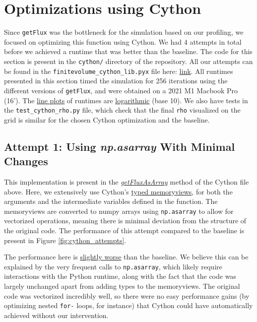 \documentclass[a4paper,10pt]{article}
\begin{document}
\section{Optimizations using Cython}
Since \verb|getFlux| was the bottleneck for the simulation based on our profiling, we focused on optimizing this function using Cython. We had 4 attempts in total before we achieved a runtime that was better than the baseline. The code for this section is present in the \verb|cython/| directory of the repository. All our attempts can be found in the \verb|finitevolume_cython_lib.pyx| file here: \href{https://github.com/paulmyr/DD2358-HPC25/blob/master/10_project_rishi_paul/code/cython/finitevolume_cython_lib.pyx}{link}.  All runtimes presented in this section timed the simulation for 256 iterations using the different versions of \verb|getFlux|, and were obtained on a 2021 M1 Macbook Pro (16'). The \underline{line plots} of runtimes are \underline{logarithmic} (base 10). We also have tests in the \verb|test_cython_rho.py| file, which check that the final \verb|rho| visualized on the grid is similar for the chosen Cython optimization and the baseline.

\subsection{Attempt 1: Using \textit{np.asarray} With Minimal Changes}
This implementation is present in the \href{https://github.com/paulmyr/DD2358-HPC25/blob/master/10_project_rishi_paul/code/cython/finitevolume_cython_lib.pyx#L8}{\textit{getFluxAsArray}} method of the Cython file above. Here, we extensively use Cython's \underline{typed memoryviews}, for both the arguments and the intermediate variables defined in the function. The memoryviews are converted to numpy arrays using \verb|np.asarray| to allow for vectorized operations, meaning there is minimal deviation from the structure of the original code. The performance of this attempt compared to the baseline is present in Figure \ref{fig:cython_attempts}. 

The performance here is \underline{slightly worse} than the baseline. We believe this can be explained by the very frequent calls to \verb|np.asarray|, which likely require interactions with the Python runtime, along with the fact that the code was largely unchanged apart from adding types to the memoryviews. The original code was vectorized incredibly well, so there were no easy performance gains (by optimizing nested \verb|for-| loops, for instance) that Cython could have automatically achieved without our intervention.
\end{document}
